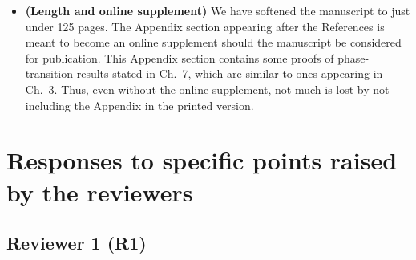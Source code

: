 \documentclass[11pt]{article}
\begin{document}
\begin{itemize}
 \item {\bf (Length and online supplement)} We have softened the manuscript to just under 125 pages. The Appendix section appearing after the 
 References is meant to become an online supplement should the manuscript be considered for publication.  This Appendix section contains some proofs
 of phase-transition results stated in Ch.\ 7, which are similar to ones appearing in Ch.\ 3.  Thus, even without the online supplement, not much is lost by
 not including the Appendix in the printed version. 

  
 \end{itemize}
 
 
 \section{Responses to specific points raised by the reviewers}
 
 \subsection{Reviewer 1 (R1)}
 
\end{document}
